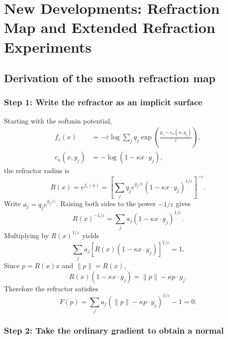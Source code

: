 \clearpage
\section{New Developments: Refraction Map and Extended Refraction Experiments}
\label{sec:new-developments}

\subsection{Derivation of the smooth refraction map}

\subsubsection{Step 1: Write the refractor as an implicit surface}

Starting with the softmin potential,
\begin{align}
 f_\varepsilon(x)
 &=-\varepsilon\log\sum_jq_j
   \exp\!\left(\frac{g_j-c_\kappa(x,y_j)}{\varepsilon}\right),
 \\
 c_\kappa(x,y_j)&=-\log(1-\kappa x\cdot y_j),
\end{align}
the refractor radius is
\begin{equation}
 R(x)=e^{f_\varepsilon(x)}
 =\left[\sum_jq_je^{g_j/\varepsilon}
           (1-\kappa x\cdot y_j)^{1/\varepsilon}\right]^{-\varepsilon}.
\end{equation}
Write $a_j=q_je^{g_j/\varepsilon}$. Raising both sides to the power
$-1/\varepsilon$ gives
\[
 R(x)^{-1/\varepsilon}
 =\sum_j a_j(1-\kappa x\cdot y_j)^{1/\varepsilon}.
\]
Multiplying by $R(x)^{1/\varepsilon}$ yields
\[
 \sum_j a_j[R(x)(1-\kappa x\cdot y_j)]^{1/\varepsilon}=1.
\]
Since $p=R(x)x$ and $\|p\|=R(x)$,
\[
 R(x)(1-\kappa x\cdot y_j)=\|p\|-\kappa p\cdot y_j.
\]
Therefore the refractor satisfies
\begin{equation}
 \boxed{F(p)=\sum_j a_j(\|p\|-\kappa p\cdot y_j)^{1/\varepsilon}-1=0.}
 \label{eq:new-implicit-refractor}
\end{equation}

\subsubsection{Step 2: Take the ordinary gradient to obtain a normal}


